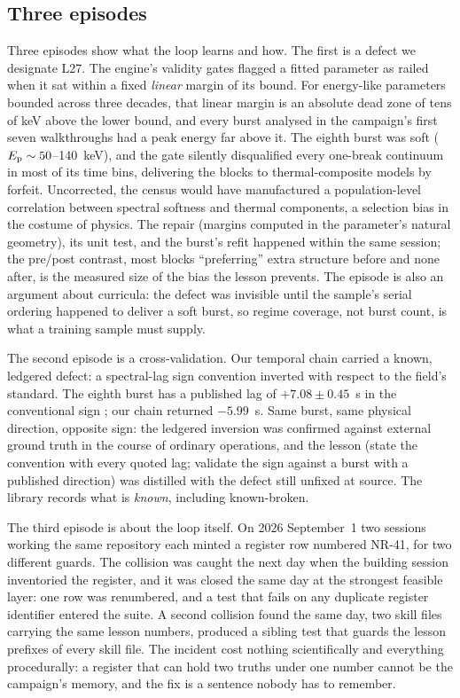\subsection{Three episodes} \label{sec:episodes}

Three episodes show what the loop learns and how. The first is a defect we
designate L27. The engine's validity gates flagged a fitted parameter as
railed when it sat within a fixed \emph{linear} margin of its bound. For
energy-like parameters bounded across three decades, that linear margin is
an absolute dead zone of tens of keV above the lower bound, and every burst
analysed in the campaign's first seven walkthroughs had a peak energy far
above it. The eighth burst was soft ($E_{\rm p}\sim50$--140~keV\prov), and the
gate silently disqualified every one-break continuum in most of its time
bins, delivering the blocks to thermal-composite models by forfeit.
Uncorrected, the census would have manufactured a population-level
correlation between spectral softness and thermal components, a selection
bias in the costume of physics. The repair (margins computed in the
parameter's natural geometry), its unit test, and the burst's refit
happened within the same session; the pre/post contrast, most blocks
``preferring'' extra structure before and none after\prov, is the measured
size of the bias the lesson prevents. The episode is also an argument about
curricula: the defect was invisible until the sample's serial ordering
happened to deliver a soft burst, so regime coverage, not burst count, is
what a training sample must supply.

The second episode is a cross-validation. Our temporal chain carried a
known, ledgered defect: a spectral-lag sign convention inverted with respect
to the field's standard. The eighth burst has a published lag of
$+7.08\pm0.45$~s in the conventional sign \citep{2018ApJ...865..153L}; our
chain returned $-5.99$~s\prov. Same burst, same physical direction, opposite
sign: the ledgered inversion was confirmed against external ground truth in
the course of ordinary operations, and the lesson (state the convention
with every quoted lag; validate the sign against a burst with a published
direction) was distilled with the defect still unfixed at source. The
library records what is \emph{known}, including known-broken.

The third episode is about the loop itself. On 2026 September~1 two
sessions working the same repository each minted a register row numbered
NR-41, for two different guards. The collision was caught the next day when
the building session inventoried the register, and it was closed the same
day at the strongest feasible layer: one row was renumbered, and a test
that fails on any duplicate register identifier entered the suite. A second
collision found the same day, two skill files carrying the same lesson
numbers, produced a sibling test that guards the lesson prefixes of every
skill file. The incident cost nothing
scientifically and everything procedurally: a register that can hold two
truths under one number cannot be the campaign's memory, and the fix is a
sentence nobody has to remember.

